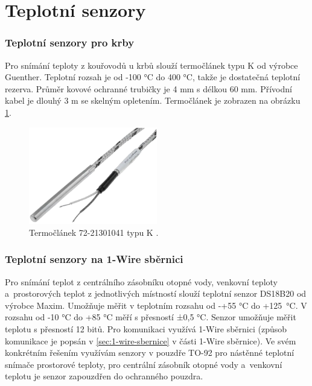 \section{Teplotní senzory}
\subsubsection{Teplotní senzory pro krby}
\label{sec:teplotni-senzory-pro-krby}
Pro snímání teploty z kouřovodů u krbů slouží termočlánek typu K od výrobce Guenther. Teplotní rozsah je od -100 °C do 400 °C, takže je dostatečná teplotní rezerva. Průměr kovové ochranné trubičky je 4 mm s délkou 60 mm. Přívodní kabel je dlouhý 3 m se skelným opletením. Termočlánek je zobrazen na obrázku \ref{fig:termoclanek-72-21301041-k}.

\begin{figure}[H]
    \centering
    \includegraphics[width=0.5\textwidth]{images/termoclanek-72-21301041-k.png}
    \caption[Termočlánek 72-21301041 typu K.]{Termočlánek 72-21301041 typu K \cite{termoclanek-k}.}
    \label{fig:termoclanek-72-21301041-k}
\end{figure}

\subsubsection{Teplotní senzory na 1-Wire sběrnici}
Pro snímání teplot z centrálního zásobníku otopné vody, venkovní teploty a~prostorových teplot z jednotlivých místností slouží teplotní senzor DS18B20 od výrobce Maxim. Umožňuje měřit
v teplotním rozsahu od -+55 °C do +125~°C. V rozsahu od -10 °C do +85 °C měří s přesností ±0,5 °C. Senzor umožňuje měřit teplotu s přesností 12 bitů. Pro komunikaci využívá 1-Wire sběrnici (způsob komunikace je popsán v \ref{sec:1-wire-sbernice} v části 1-Wire sběrnice). Ve svém konkrétním řešením využívám senzory v pouzdře TO-92 pro nástěnné teplotní snímače prostorové teploty, pro centrální zásobník otopné vody a~venkovní teplotu je senzor zapouzdřen do ochranného pouzdra.


